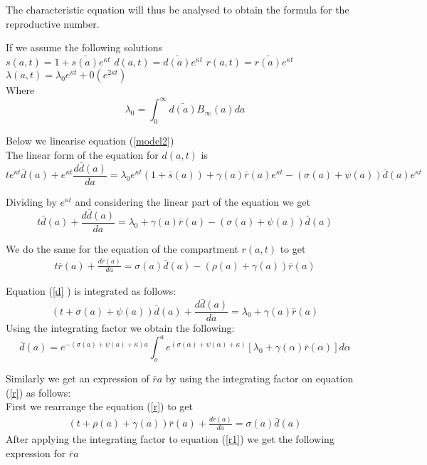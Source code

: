 The characteristic equation will thus be analysed to obtain the formula for the reproductive number.

If we assume the following solutions \\

$s(a,t)=1+\bar{s(a)}e^{\kappa t}$ \; $d(a,t)=\bar{d(a)}e^{\kappa t}$\;
$r(a,t)=\bar{r(a)}e^{\kappa t}$\;
$\lambda(a,t)=\lambda_0 e^{\kappa t} + 0(e^{2 \kappa t})$ \\
Where
\[\lambda_0 = \int_{0}^{\infty}\bar{d(a)} B_{\infty} (a) da\]

Below we linearise equation (\ref{model2})\\
The linear form of the equation for $d(a,t)$ is \\

\[te^{\kappa t} \bar{d}(a) + e^{\kappa t} \frac{d \bar{d}(a)}{da}= \lambda_0 e^{\kappa t}( 1+ \bar{s}(a)) + \gamma (a) \bar{r}(a) e^{\kappa t} - (\sigma (a) + \psi (a))\bar{d}(a) e^{\kappa t}\]

Dividing by $e^{\kappa t }$ and considering the linear part of the equation we get
\begin{equation}\label{d}
 t \bar{d}(a) +  \frac{d \bar{d}(a)}{da}= \lambda_0  + \gamma (a) \bar{r}(a) - (\sigma (a) + \psi (a))\bar{d}(a) 
 \end{equation}

We do the same for the equation of the compartment $r(a,t)$ to get
\begin{eqnarray}\label{r}
 t \bar{r}(a) + \frac{d\bar{r}(a)}{da}= \sigma (a) \bar{d}(a)-(\rho (a) +\gamma(a))\bar{r}(a)
 \end{eqnarray}
 
 Equation (\ref{d} ) is integrated as follows:
 \begin{equation}\label{d1}
 (t +\sigma (a) + \psi (a))\bar{d}(a)  +  \frac{d \bar{d}(a)}{da}= \lambda_0  + \gamma (a) \bar{r}(a) 
 \end{equation}
 Using the integrating factor we obtain the following:
 \begin{equation}\label{d3}
 \bar{d}(a)=e^{-(\sigma (a)+ \psi(a) + \kappa)a}\int_{o}^{a} e^{(\sigma (\alpha)+ \psi(\alpha) + \kappa)}[\lambda_0 + \gamma(\alpha)\bar{r}(\alpha)] d \alpha
 \end{equation}
 
 Similarly we get an expression of $\bar{r} a$ by using the integrating factor on equation (\ref{r}) as follows:\\
 
  First we rearrange the equation (\ref{r}) to get
 \begin{eqnarray}\label{r1}
 (t+\rho (a) +\gamma(a))\bar{r}(a) + \frac{d\bar{r}(a)}{da}= \sigma (a) \bar{d}(a)
 \end{eqnarray}
 After applying the integrating factor to equation (\ref{r1}) we get the following expression for $\bar{r}a$
 
